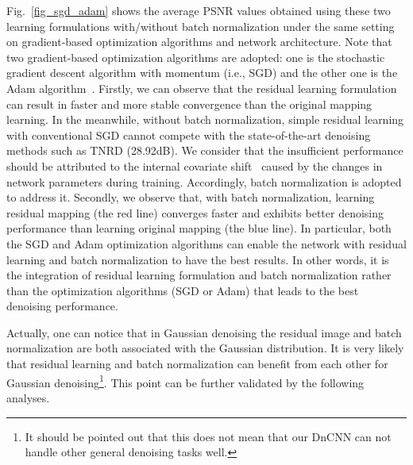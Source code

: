 \documentclass[journal]{IEEEtran}
\begin{document}
Fig.~\ref{fig_sgd_adam} shows the average PSNR values obtained using these two learning formulations with/without batch normalization under the same setting on gradient-based optimization algorithms and network architecture. Note that two gradient-based optimization algorithms are adopted: one is the stochastic gradient descent algorithm with momentum (i.e., SGD) and the other one is the Adam algorithm~\cite{kingma2014adam}.
Firstly, we can observe that the residual learning formulation can result in faster and more stable convergence than the original mapping learning. In the meanwhile, without batch normalization, simple residual learning with conventional SGD cannot compete with the state-of-the-art denoising methods such as TNRD (28.92dB).
We consider that the insufficient performance should be attributed to the internal covariate shift~\cite{ioffe2015batch} caused by the changes in network parameters during training.
Accordingly, batch normalization is adopted to address it.
Secondly, we observe that, with batch normalization, learning residual mapping (the red line) converges faster and exhibits better denoising performance than learning original mapping (the blue line). In particular, both the SGD and Adam optimization algorithms can enable the network with residual learning and batch normalization to have the best results.
In other words, it is the integration of residual learning formulation and batch normalization rather than the optimization algorithms (SGD or Adam) that leads to the best denoising performance.


Actually, one can notice that in Gaussian denoising the residual image and batch normalization are both associated with the Gaussian distribution. It is very likely that residual learning and batch normalization can benefit from each other for Gaussian denoising\footnote{It should be pointed out that this does not mean that our DnCNN can not handle other general denoising tasks well.}.
This point can be further validated by the following analyses.
\end{document}
